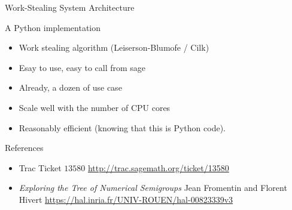 \documentclass{beamer}
\begin{document}


\begin{frame}{Work-Stealing System Architecture}
  
  \begin{block}{A Python implementation}
    \begin{itemize}
    \item Work stealing algorithm (Leiserson-Blumofe / Cilk)
    \item Esay to use, easy to call from sage
    \item Already, a dozen of use case
    \item Scale well with the number of CPU cores
    \item Reasonably efficient (knowing that this is Python code).
    \end{itemize}
  \end{block}

  \begin{block}{References}
\begin{itemize}  \item Trac Ticket $13580$ \url{http://trac.sagemath.org/ticket/13580}
    \bigskip
    
  \item \textit{Exploring the Tree of Numerical Semigroups} Jean Fromentin
    and Florent Hivert \url{https://hal.inria.fr/UNIV-ROUEN/hal-00823339v3}
\end{itemize}
  \end{block}
\end{frame}
\end{document}
